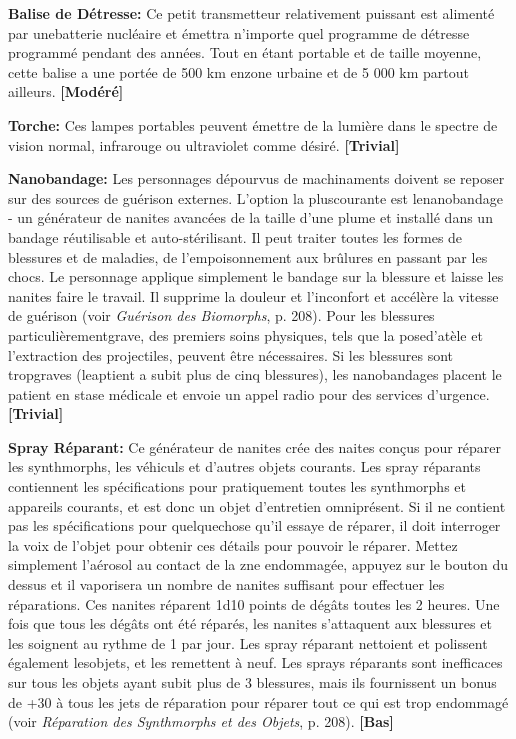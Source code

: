 \textbf{Balise de Détresse:} Ce petit transmetteur relativement puissant est alimenté par unebatterie nucléaire et émettra n'importe quel programme de détresse programmé pendant des années. Tout en étant portable et de taille moyenne, cette balise a une portée de 500 km enzone urbaine et de 5 000 km partout ailleurs. \textbf{[Modéré]} 

\textbf{Torche:} Ces lampes portables peuvent émettre de la lumière dans le spectre de vision normal, infrarouge ou ultraviolet comme désiré. \textbf{[Trivial]} 

\textbf{Nanobandage:} Les personnages dépourvus de machinaments doivent se reposer sur des sources de guérison externes. L'option la pluscourante est lenanobandage - un générateur de nanites avancées de la taille d'une plume et installé dans un bandage réutilisable et auto-stérilisant. Il peut traiter toutes les formes de blessures et de maladies, de l'empoisonnement aux brûlures en passant par les chocs. Le personnage applique simplement le bandage sur la blessure et laisse les nanites faire le travail. Il supprime la douleur et l'inconfort et accélère la vitesse de guérison (voir \emph{Guérison des Biomorphs}, p. 208). Pour les blessures particulièrementgrave, des premiers soins physiques, tels que la posed'atèle et l'extraction des projectiles, peuvent être nécessaires. Si les blessures sont tropgraves (leaptient a subit plus de cinq blessures), les nanobandages placent le patient en stase médicale et envoie un appel radio pour des services d'urgence. \textbf{[Trivial]} 

\textbf{Spray Réparant:} Ce générateur de nanites crée des naites conçus pour réparer les synthmorphs, les véhiculs et d'autres objets courants. Les spray réparants contiennent les spécifications pour pratiquement toutes les synthmorphs et appareils courants, et est donc un objet d'entretien omniprésent. Si il ne contient pas les spécifications pour quelquechose qu'il essaye de réparer, il doit interroger la voix de l'objet pour obtenir ces détails pour pouvoir le réparer. Mettez simplement l'aérosol au contact de la zne endommagée, appuyez sur le bouton du dessus et il vaporisera un nombre de nanites suffisant pour effectuer les réparations. Ces nanites réparent 1d10 points de dégâts toutes les 2 heures. Une fois que tous les dégâts ont été réparés, les nanites s'attaquent aux blessures et les soignent au rythme de 1 par jour. Les spray réparant nettoient et polissent également lesobjets, et les remettent à neuf. Les sprays réparants sont inefficaces sur tous les objets ayant subit plus de 3 blessures, mais ils fournissent un bonus de +30 à tous les jets de réparation pour réparer tout ce qui est trop endommagé (voir \emph{Réparation des Synthmorphs et des Objets}, p. 208). \textbf{[Bas]} 

